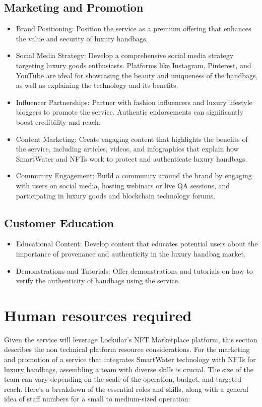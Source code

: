 \documentclass{tufte-handout}
\begin{document}
\subsection{Marketing and Promotion}\label{sec:page-layout}
\begin{itemize}
    \item Brand Positioning: Position the service as a premium offering that enhances the value and security of luxury handbags.
    \item Social Media Strategy: Develop a comprehensive social media strategy targeting luxury goods enthusiasts. Platforms like Instagram, Pinterest,
    and YouTube are ideal for showcasing the beauty and uniqueness of the handbags, as well as explaining the technology and its benefits.
    \item Influencer Partnerships: Partner with fashion influencers and luxury lifestyle bloggers to promote the service. Authentic endorsements can
    significantly boost credibility and reach.
    \item Content Marketing: Create engaging content that highlights the benefits of the service, including articles, videos, and infographics that explain
    how SmartWater and NFTs work to protect and authenticate luxury handbags.
    \item Community Engagement: Build a community around the brand by engaging with users on social media, hosting webinars or live QA sessions, and
    participating in luxury goods and blockchain technology forums.
\end{itemize}
\subsection{Customer Education}\label{sec:page-layout}
\begin{itemize}
    \item Educational Content: Develop content that educates potential users about the importance of provenance and authenticity in the luxury handbag market.
    \item Demonstrations and Tutorials: Offer demonstrations and tutorials on how to verify the authenticity of handbags using the service. 
\end{itemize}

\section{Human resources required}\label{sec:page-layout}
Given the service will leverage Lockular's NFT Marketplace platform, this section describes the non technical platform resource considerations.
For the marketing and promotion of a service that integrates SmartWater technology with NFTs for luxury handbags, assembling a team with diverse skills is crucial.
The size of the team can vary depending on the scale of the operation, budget, and targeted reach. Here's a breakdown of the essential roles and skills, along with
a general idea of staff numbers for a small to medium-sized operation:
\end{document}
